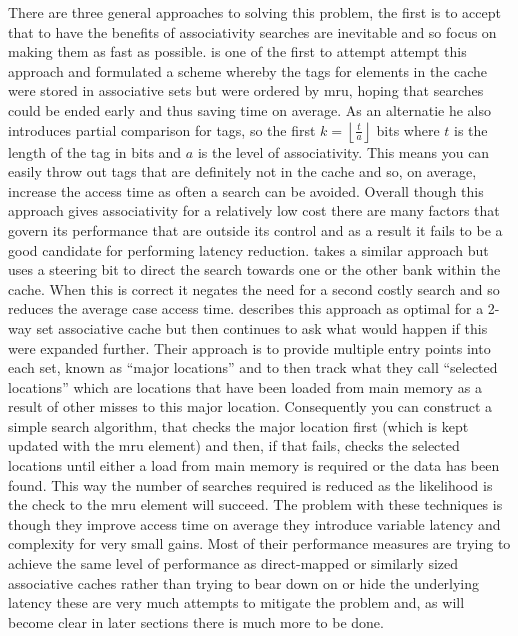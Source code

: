 There are three general approaches to solving this problem, the first is to accept that to have the benefits of associativity searches are inevitable and so focus on making them as fast as possible. \citet{kesslerInexpensiveImplementationsSetAssociativity1989} is one of the first to attempt attempt this approach and formulated a scheme whereby the tags for elements in the cache were stored in associative sets but were ordered by \gls{mru}, hoping that searches could be ended early and thus saving time on average. As an alternatie he also introduces partial comparison for tags, so the first $k = \left\lfloor\frac{t}{a}\right\rfloor$ bits where $t$ is the length of the tag in bits and $a$ is the level of associativity. This means you can easily throw out tags that are definitely not in the cache and so, on average, increase the access time as often a search can be avoided. Overall though this approach gives associativity for a relatively low cost there are many factors that govern its performance that are outside its control and as a result it fails to be a good candidate for performing latency reduction. \citet{calderPredictiveSequentialAssociative1996} takes a similar approach but uses a steering bit to direct the search towards one or the other bank within the cache. When this is correct it negates the need for a second costly search and so reduces the average case access time. \citet{chenxizhangMulticolumnImplementationsCache1997} describes this approach as optimal for a 2-way set associative cache but then continues to ask what would happen if this were expanded further. Their approach is to provide multiple entry points into each set, known as ``major locations'' and to then track what they call ``selected locations'' which are locations that have been loaded from main memory as a result of other misses to this major location. Consequently you can construct a simple search algorithm, that checks the major location first (which is kept updated with the \gls{mru} element) and then, if that fails, checks the selected locations until either a load from main memory is required or the data has been found. This way the number of searches required is reduced as the likelihood is the check to the \gls{mru} element will succeed. The problem with these techniques is though they improve access time on average they introduce variable latency and complexity for very small gains. Most of their performance measures are trying to achieve the same level of performance as direct-mapped or similarly sized associative caches rather than trying to bear down on or hide the underlying latency these are very much attempts to mitigate the problem and, as will become clear in later sections there is much more to be done.

